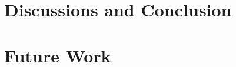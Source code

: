 \documentclass[12pt,twoside]{article}
\begin{document}
\section{Discussions and Conclusion}
\label{section:DiscussionAndConclusion}

\section{Future Work}
\label{section:FutureWork}







\end{document}

